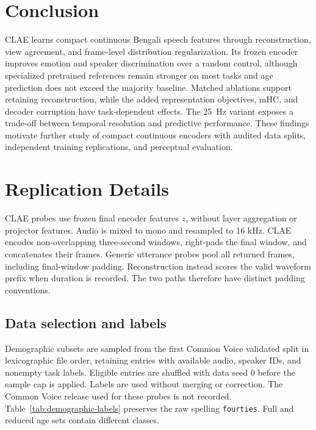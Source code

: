 \documentclass[11pt,a4paper]{article}
\begin{document}
\section{Conclusion}

CLAE learns compact continuous Bengali speech features through reconstruction, view agreement, and frame-level distribution regularization. Its frozen encoder improves emotion and speaker discrimination over a random control, although specialized pretrained references remain stronger on most tasks and age prediction does not exceed the majority baseline. Matched ablations support retaining reconstruction, while the added representation objectives, mHC, and decoder corruption have task-dependent effects. The 25~Hz variant exposes a trade-off between temporal resolution and predictive performance. These findings motivate further study of compact continuous encoders with audited data splits, independent training replications, and perceptual evaluation.



\clearpage

\appendix
\section{Replication Details}
\label{sec:replication}

CLAE probes use frozen final encoder features $z$, without layer aggregation or projector features. Audio is mixed to mono and resampled to 16 kHz. CLAE encodes non-overlapping three-second windows, right-pads the final window, and concatenates their frames. Generic utterance probes pool all returned frames, including final-window padding. Reconstruction instead scores the valid waveform prefix when duration is recorded. The two paths therefore have distinct padding conventions.

\subsection{Data selection and labels}

Demographic subsets are sampled from the first Common Voice validated split in lexicographic file order, retaining entries with available audio, speaker IDs, and nonempty task labels. Eligible entries are shuffled with data seed 0 before the sample cap is applied. Labels are used without merging or correction. The Common Voice release used for these probes is not recorded. Table~\ref{tab:demographic-labels} preserves the raw spelling \texttt{fourties}. Full and reduced age sets contain different classes.
\end{document}
